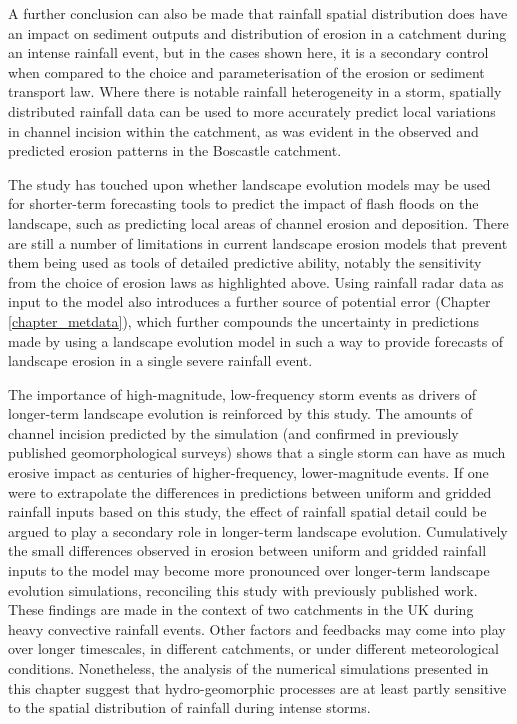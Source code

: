 A further conclusion can also be made that rainfall spatial distribution does have an impact on sediment outputs and distribution of erosion in a catchment during an intense rainfall event, but in the cases shown here, it is a secondary control when compared to the choice and parameterisation of the erosion or sediment transport law. Where there is notable rainfall heterogeneity in a storm, spatially distributed rainfall data can be used to more accurately predict local variations in channel incision within the catchment, as was evident in the observed and predicted erosion patterns in the Boscastle catchment.

The study has touched upon whether landscape evolution models may be used for shorter-term forecasting tools to predict the impact of flash floods on the landscape, such as predicting local areas of channel erosion and deposition. There are still a number of limitations in current landscape erosion models that prevent them being used as tools of detailed predictive ability, notably the sensitivity from the choice of erosion laws as highlighted above. Using rainfall radar data as input to the model also introduces a further source of potential error (Chapter \ref{chapter_metdata}), which further compounds the uncertainty in predictions made by using a landscape evolution model in such a way to provide forecasts of landscape erosion in a single severe rainfall event. 

The importance of high-magnitude, low-frequency storm events as drivers of longer-term landscape evolution is reinforced by this study. The amounts of channel incision predicted by the simulation (and confirmed in previously published geomorphological surveys) shows that a single storm can have as much erosive impact as centuries of higher-frequency, lower-magnitude events. If one were to extrapolate the differences in predictions between uniform and gridded rainfall inputs based on this study, the effect of rainfall spatial detail could be argued to play a secondary role in longer-term landscape evolution. Cumulatively the small differences observed in erosion between uniform and gridded rainfall inputs to the model may become more pronounced over longer-term landscape evolution simulations, reconciling this study with previously published work. These findings are made in the context of two catchments in the UK during heavy convective rainfall events. Other factors and feedbacks may come into play over longer timescales, in different catchments, or under different meteorological conditions. Nonetheless, the analysis of the numerical simulations presented in this chapter suggest that hydro-geomorphic processes are at least partly sensitive to the spatial distribution of rainfall during intense storms.









